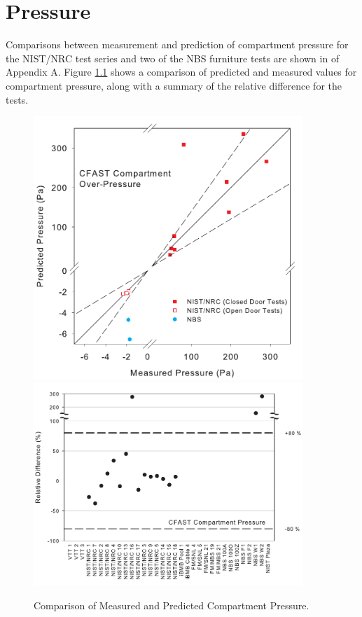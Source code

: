\chapter{Pressure}

Comparisons between measurement and prediction of compartment pressure for the NIST/NRC test series and two of the NBS furniture tests are shown in of Appendix A.  Figure \ref{fig:Pressure_Scatter} shows a comparison of predicted and measured values for compartment pressure, along with a summary of the relative difference for the tests.

\begin{figure}
\begin{center}
\includegraphics[width=4.0in]{FIGURES/ScatterPlots/Pressure}  \\
\includegraphics[width=4.0in]{FIGURES/Relative_Diff/Pressure}  
\end{center}
\caption{Comparison of Measured and Predicted Compartment Pressure.} \label{fig:Pressure_Scatter}
\end{figure}

